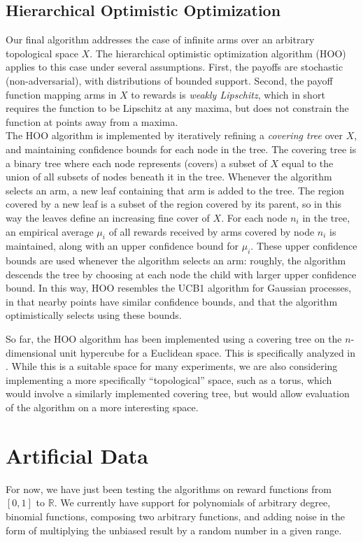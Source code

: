 \documentclass{article}
\begin{document}
\subsection{Hierarchical Optimistic Optimization}
Our final algorithm addresses the case of infinite arms over an
arbitrary topological space $X$. The hierarchical optimistic
optimization algorithm (HOO) applies to this case under several
assumptions. First, the payoffs are stochastic (non-adversarial), with
distributions of bounded support. Second, the payoff function mapping
arms in $X$ to rewards is \emph{weakly Lipschitz}, which in short requires
the function to be Lipschitz at any maxima, but does not constrain the
function at points away from a maxima.
\\
The HOO algorithm is implemented by iteratively refining a
\emph{covering tree} over $X$, and maintaining confidence bounds
for each node in the tree. The covering tree is a binary tree where
each node represents (covers) a subset of $X$ equal to the union of
all subsets of nodes beneath it in the tree. Whenever the algorithm
selects an arm, a new leaf containing that arm is added to the
tree. The region covered by a new leaf is a subset of the region
covered by its parent, so in this way the leaves define an increasing
fine cover of $X$. For each node $n_i$ in the tree, an empirical
average $\mu_i$ of all rewards received by arms covered by node $n_i$
is maintained, along with an upper confidence bound for
$\mu_i$. These upper confidence bounds are used whenever the algorithm
selects an arm: roughly, the algorithm descends the tree by choosing
at each node the child with larger upper confidence bound. In this
way, HOO resembles the UCB1 algorithm for Gaussian processes, in that
nearby points have similar confidence bounds, and that the algorithm
optimistically selects using these bounds.

So far, the HOO algorithm has been implemented using a covering tree
on the $n$-dimensional unit hypercube for a Euclidean space. This is
specifically analyzed in \cite{xArmed}. While this is a suitable space
for many experiments, we are also considering implementing a more
specifically ``topological'' space, such as a torus, which would
involve a similarly implemented covering tree, but would allow
evaluation of the algorithm on a more interesting space.  \\
\section{Artificial Data}
For now, we have just been testing the algorithms on reward functions from
$[0,1]$ to $\mathbb{R}$.  We currently have support for polynomials
of arbitrary degree, binomial functions, composing two arbitrary functions,
and adding noise in the form of multiplying the unbiased result by a random
number in a given range.
\end{document}
